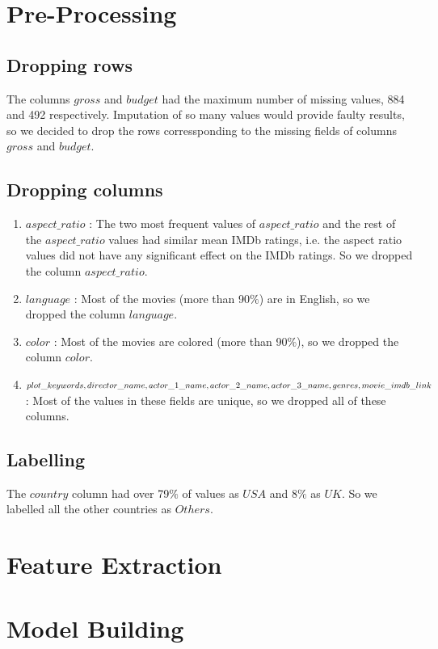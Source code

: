 \documentclass[conference]{IEEEtran}
\begin{document}
\section{Pre-Processing}
\subsection{Dropping rows}
The columns $gross$ and $budget$ had the maximum number of missing values, 884 and 492 respectively. Imputation of so many values would provide faulty results, so we decided to drop the rows corressponding to the missing fields of columns $gross$ and $budget$.
\subsection{Dropping columns}
	\begin{enumerate}
		\item $aspect\_ratio$ : The two most frequent values of $aspect\_ratio			$ and the rest of the $aspect\_ratio$ values had similar mean IMDb 				ratings, i.e. the aspect ratio values did not have any significant effect on the IMDb ratings. So we dropped the column $aspect\_ratio$.
		\item $language$ : Most of the movies (more than 90$\%$) are in 				English, so we dropped the column $language$.
		\item $color$ : Most of the movies are colored (more than 90$\%$), so 			we dropped the column $color$.
		\item $plot\_keywords, director\_name, actor\_1\_name, \\ actor					\_2\_name,			actor\_3\_name, genres,\\ movie\_imdb\_link$ : 				Most 			of the values in 				these fields are 				unique, so we dropped 		all of these columns.
	\end{enumerate}
\subsection{Labelling}
The $country$ column had over 79$\%$ of values as $USA$ and 8$\%$ as $UK$. So we labelled all the other countries as $Others$.


\section{Feature Extraction}
\section{Model Building}
\newpage


\end{document}
